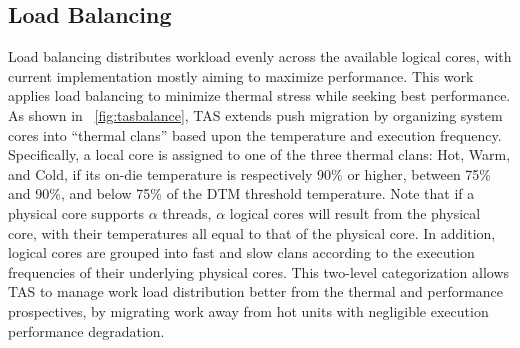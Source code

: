 \documentclass[times, 10pt,twocolumn]{IEEEtran}
\begin{document}
\subsection{Load Balancing}
\label{sec:loadbalance} 
Load balancing distributes workload evenly across the available logical
cores, with current implementation mostly aiming to maximize
performance.  This work applies load balancing to minimize thermal
stress while seeking best performance.  As shown in
\figurename~\ref{fig:tasbalance}, TAS extends push migration by
organizing system cores into ``thermal clans'' based upon the
temperature and execution frequency.  Specifically, a local core is
assigned to one of the three thermal clans: Hot, Warm, and Cold, if its
on-die temperature is respectively 90\% or higher, between 75\% and
90\%, and below 75\% of the DTM threshold temperature.  Note that if a
physical core supports $\alpha$ threads, $\alpha$ logical cores will
result from the physical core, with their temperatures all equal to that
of the physical core.  In addition, logical cores are grouped into fast
and slow clans according to the execution frequencies of their
underlying physical cores.  This two-level categorization allows TAS to
manage work load distribution better from the thermal and performance
prospectives, by migrating work away from hot units with negligible
execution performance degradation.
\end{document}
